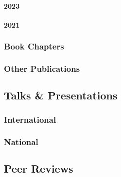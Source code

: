 \documentclass[
  letterpaper,
  DIV=11,
  numbers=noendperiod]{scrartcl}
\let\oldparagraph\paragraph
\renewcommand{\paragraph}[1]{\oldparagraph{#1}\mbox{}}
\begin{document}
\paragraph{2023}\label{section-1}

\label{published-papers-2023}

\paragraph{2021}\label{section-2}

\label{published-papers-2021}

\subsubsection{\texorpdfstring{ Book
Chapters}{ Book Chapters}}\label{book-chapters}

\label{book-chapters}

\subsubsection{\texorpdfstring{ Other
Publications}{ Other Publications}}\label{other-publications}

\label{other}

\subsection{\texorpdfstring{ Talks \&
Presentations}{ Talks \& Presentations}}\label{talks-presentations}

\subsubsection{International}\label{international}

\label{talks-international}

\subsubsection{National}\label{national}

\label{talks-national}

\subsection{\texorpdfstring{ Peer
Reviews}{ Peer Reviews}}\label{peer-reviews}
\end{document}
